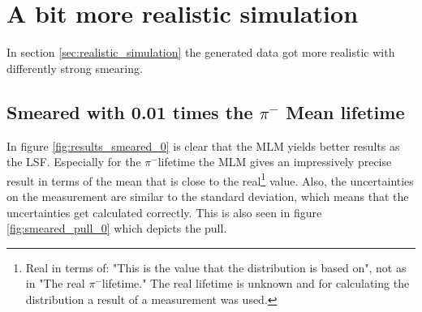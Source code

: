 \documentclass[11pt, a4paper, oneside]{book}
\newcommand{\pion}{$\pi^{-}$}
\newcommand{\muon}{$\mu^{-}$}
\begin{document}

\newpage
\section{A bit more realistic simulation} \label{sec:more_realisitic_results}

In section \ref{sec:realistic_simulation} the generated data got more realistic with differently strong smearing.

\subsection{Smeared with 0.01 times the \texorpdfstring{\pion}{pion} Mean lifetime}

In figure \ref{fig:results_smeared_0} is clear that the MLM yields better results as the LSF. Especially for the \pion lifetime the MLM gives an impressively precise result in terms of the mean that is close to the real\footnote{Real in terms of: "This is the value that the distribution is based on", not as in "The real \pion lifetime." The real lifetime is unknown and for calculating the distribution a result of a measurement was used.} value. Also, the uncertainties on the measurement are similar to the standard deviation, which means that the uncertainties get calculated correctly. This is also seen in figure \ref{fig:smeared_pull_0} which depicts the pull.
\end{document}
